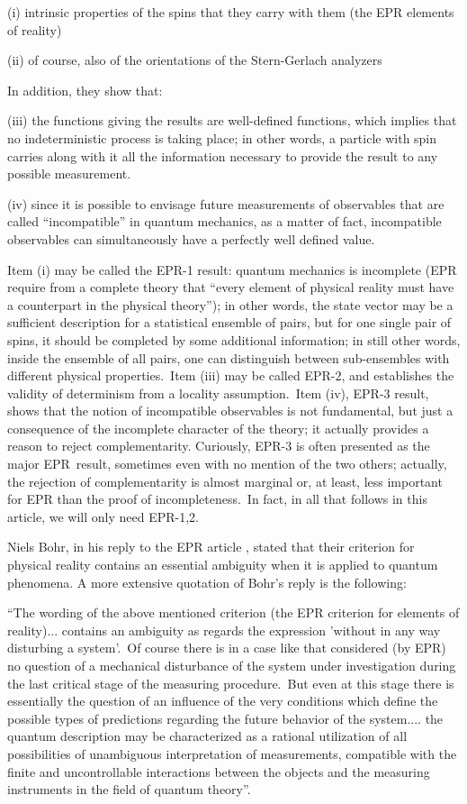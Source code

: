 \documentclass[12pt,onecolumn]{article}%
\begin{document}
(i) intrinsic properties of the spins that they carry with them (the EPR
elements of reality)

(ii) of course, also of the orientations of the Stern-Gerlach analyzers

In addition, they show that:

(iii) the functions giving the results are well-defined functions, which
implies that no indeterministic process is taking place; in other words, a
particle with spin carries along with it all the information necessary to
provide the result to any possible measurement.

(iv) since it is possible to envisage future measurements of observables that
are called ``incompatible'' in quantum mechanics, as a matter of fact,
incompatible observables can simultaneously have a perfectly well defined value.

Item (i) may be called the EPR-1 result: quantum mechanics is incomplete (EPR
require from a complete theory that ``every element of physical reality must
have a counterpart in the physical theory''); in other words, the state vector
may be a sufficient description for a statistical ensemble of pairs, but for
one single pair of spins, it should be completed by some additional
information; in still other words, inside the ensemble of all pairs, one can
distinguish between sub-ensembles with different physical properties.\ Item
(iii) may be called EPR-2, and establishes the validity of determinism from a
locality assumption.\ Item (iv), EPR-3 result, shows that the notion of
incompatible observables is not fundamental, but just a consequence of the
incomplete character of the theory; it actually provides a reason to reject
complementarity. Curiously, EPR-3 is often presented as the major EPR\ result,
sometimes even with no mention of the two others; actually, the rejection of
complementarity is almost marginal or, at least, less important for EPR than
the proof of incompleteness.\ In fact, in all that follows in this article, we
will only need EPR-1,2.

Niels Bohr, in his reply to the EPR article \cite{Bohr-EPR}, stated that their
criterion for physical reality contains an essential ambiguity when it is
applied to quantum phenomena. A more extensive quotation of Bohr's reply is
the following:

``The wording of the above mentioned criterion (the EPR criterion for elements
of reality)... contains an ambiguity as regards the expression 'without in any
way disturbing a system'.\ Of course there is in a case like that considered
(by EPR) no question of a mechanical disturbance of the system under
investigation during the last critical stage of the measuring procedure.\ But
even at this stage there is essentially the question of an influence of the
very conditions which define the possible types of predictions regarding the
future behavior of the system.... the quantum description may be characterized
as a rational utilization of all possibilities of unambiguous interpretation
of measurements, compatible with the finite and uncontrollable interactions
between the objects and the measuring instruments in the field of quantum theory''.
\end{document}
